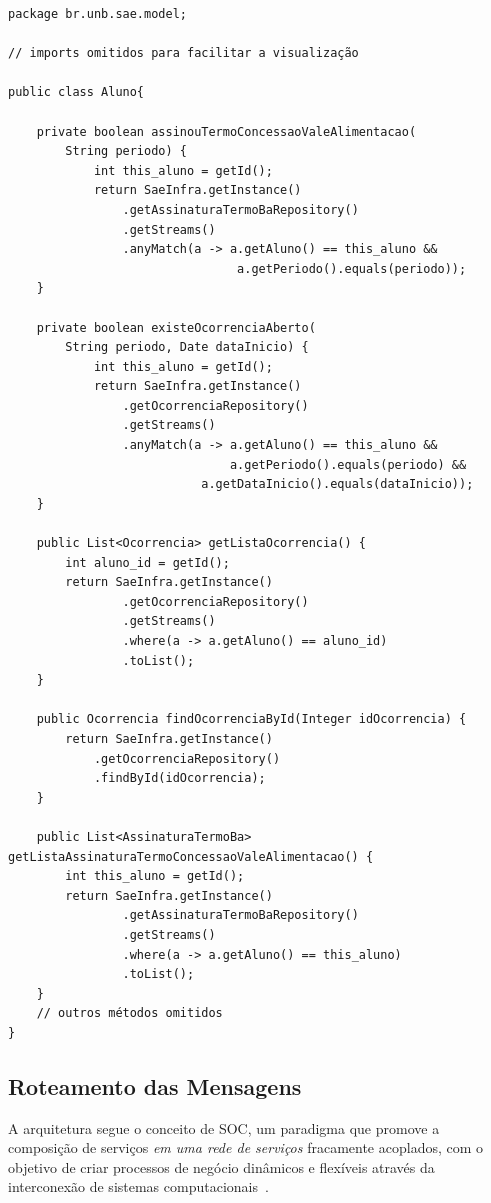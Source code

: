              
\renewcommand{\lstlistingname}{Código}             
\begin{lstlisting}[caption=Exemplo de uso do método getStream() dos repositórios para consulta., label=fig:exemplo_get_stream]
package br.unb.sae.model;

// imports omitidos para facilitar a visualização

public class Aluno{

	private boolean assinouTermoConcessaoValeAlimentacao(
		String periodo) {
			int this_aluno = getId();
			return SaeInfra.getInstance()
				.getAssinaturaTermoBaRepository()
				.getStreams()
				.anyMatch(a -> a.getAluno() == this_aluno &&
							    a.getPeriodo().equals(periodo));
	}

	private boolean existeOcorrenciaAberto(
		String periodo, Date dataInicio) {
			int this_aluno = getId();
			return SaeInfra.getInstance()
				.getOcorrenciaRepository()
				.getStreams()
				.anyMatch(a -> a.getAluno() == this_aluno &&
							   a.getPeriodo().equals(periodo) &&
					       a.getDataInicio().equals(dataInicio));
	}

	public List<Ocorrencia> getListaOcorrencia() {
		int aluno_id = getId();
		return SaeInfra.getInstance()
				.getOcorrenciaRepository()
				.getStreams()
				.where(a -> a.getAluno() == aluno_id)
				.toList();
	}    
	
	public Ocorrencia findOcorrenciaById(Integer idOcorrencia) {
		return SaeInfra.getInstance()
			.getOcorrenciaRepository()
			.findById(idOcorrencia);
	}
	
	public List<AssinaturaTermoBa> getListaAssinaturaTermoConcessaoValeAlimentacao() {
		int this_aluno = getId();
		return SaeInfra.getInstance()
				.getAssinaturaTermoBaRepository()
				.getStreams()
				.where(a -> a.getAluno() == this_aluno)
				.toList();
	}
	// outros métodos omitidos
}
\end{lstlisting}



\subsection{Roteamento das Mensagens}\label{roteamento}

A arquitetura segue o conceito de \acrfull{SOC}, 
um paradigma que promove a composição de serviços \emph{em uma rede de serviços} 
fracamente acoplados, com o objetivo de criar processos de negócio dinâmicos 
e flexíveis através da interconexão de sistemas computacionais~\cite{SOAIntBlueprint:2010}. 

